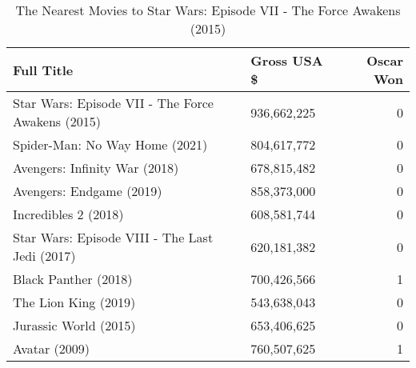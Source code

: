 \begin{table}[H]
\centering
\begin{tabular}{llr}
  \hline
Full Title & Gross USA \$ & Oscar Won \\ 
  \hline
Star Wars: Episode VII - The Force Awakens (2015) & 936,662,225 &   0 \\ 
  Spider-Man: No Way Home (2021) & 804,617,772 &   0 \\ 
  Avengers: Infinity War (2018) & 678,815,482 &   0 \\ 
  Avengers: Endgame (2019) & 858,373,000 &   0 \\ 
  Incredibles 2 (2018) & 608,581,744 &   0 \\ 
  Star Wars: Episode VIII - The Last Jedi (2017) & 620,181,382 &   0 \\ 
  Black Panther (2018) & 700,426,566 &   1 \\ 
  The Lion King (2019) & 543,638,043 &   0 \\ 
  Jurassic World (2015) & 653,406,625 &   0 \\ 
  Avatar (2009) & 760,507,625 &   1 \\ 
   \hline
\end{tabular}
\caption{The Nearest Movies to Star Wars: Episode VII - The Force Awakens (2015)} 
\end{table}

